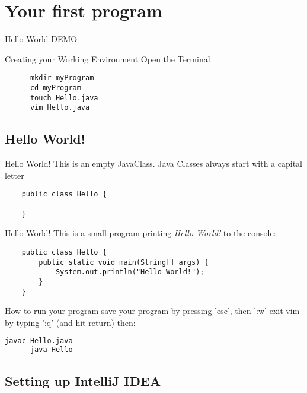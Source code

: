 \section{Your first program}
\begin{frame}{Hello World}
  DEMO
\end{frame}

\begin{frame}[fragile]{Creating your Working Environment}
  Open the Terminal
  \begin{lstlisting}
      mkdir myProgram
      cd myProgram
      touch Hello.java
      vim Hello.java
  \end{lstlisting}
\end{frame}

\subsection{Hello World!}

\begin{frame}[fragile]{Hello World!}
	This is an empty JavaClass.
  Java Classes always start with a capital letter
	\begin{lstlisting}
	public class Hello {

	}
	\end{lstlisting}
\end{frame}

\begin{frame}[fragile]{Hello World!}
	This is a small program printing \emph{Hello World!} to the console:
	\begin{lstlisting}
	public class Hello {
	    public static void main(String[] args) {
	        System.out.println("Hello World!");
	    }
	}
	\end{lstlisting}
\end{frame}

\begin{frame}[fragile]{How to run your program}
   save your program by pressing 'esc', then ':w'
   exit vim by typing ':q' (and hit return)
   then:
   \begin{lstlisting}[language=bash]
      javac Hello.java
      java Hello
   \end{lstlisting}
\end{frame}

\subsection{Setting up IntelliJ IDEA}

